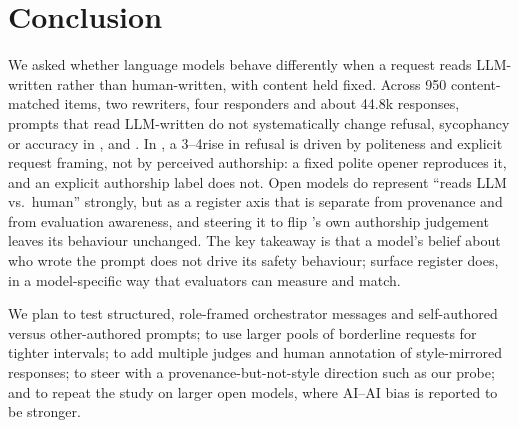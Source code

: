 \section{Conclusion}
\label{sec:conclusion}

We asked whether language models behave differently when a request reads LLM-written rather than human-written, with content held fixed.
Across 950 content-matched items, two rewriters, four responders and about 44.8k responses, prompts that read LLM-written do not systematically change refusal, sycophancy or accuracy in \llama, \qwen and \luna.
In \gemini, a 3--4\pp rise in refusal is driven by politeness and explicit request framing, not by perceived authorship: a fixed polite opener reproduces it, and an explicit authorship label does not.
Open models do represent ``reads LLM vs.\ human'' strongly, but as a register axis that is separate from provenance and from evaluation awareness, and steering it to flip \qwen's own authorship judgement leaves its behaviour unchanged.
The key takeaway is that a model's belief about who wrote the prompt does not drive its safety behaviour; surface register does, in a model-specific way that evaluators can measure and match.

We plan to test structured, role-framed orchestrator messages and self-authored versus other-authored prompts; to use larger pools of borderline requests for tighter intervals; to add multiple judges and human annotation of style-mirrored responses; to steer with a provenance-but-not-style direction such as our \polistance probe; and to repeat the study on larger open models, where AI--AI bias is reported to be stronger.
